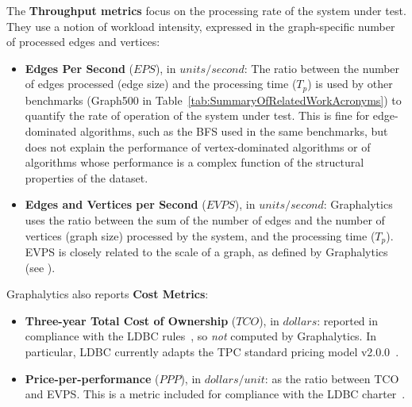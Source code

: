 The {\bf Throughput metrics} focus on the processing rate of the system under test. They use a notion of workload intensity, expressed in the graph-specific number of processed edges and vertices:
\begin{itemize}
	\item {\bf Edges Per Second} ($EPS$), in $units / second$: The ratio between the number of edges processed (edge size) and the processing time ($T_p$) is used by other benchmarks (Graph500 in Table~\ref{tab:SummaryOfRelatedWorkAcronyms}) to quantify the rate of operation of the system under test. This is fine for edge-dominated algorithms, such as the BFS used in the same benchmarks, but does not explain the performance of vertex-dominated algorithms or of algorithms whose performance is a complex function of the structural properties of the dataset.
	
	\item {\bf Edges and Vertices per Second} ($EVPS$), in $units / second$: Graphalytics uses the ratio between the sum of the number of edges and the number of vertices (graph size) processed by the system, and the processing time ($T_p$). EVPS is closely related to the scale of a graph, as defined by Graphalytics (see ).
\end{itemize}

Graphalytics also reports {\bf Cost Metrics}:

\begin{itemize}
	\item {\bf Three-year Total Cost of Ownership} ($TCO$), in $dollars$: reported in compliance with the LDBC rules~\cite{ldbc_byelaws}, so {\it not} computed by Graphalytics. In particular, LDBC currently adapts the TPC standard pricing model v2.0.0~\cite{tpc_pricing}.
	
	\item {\bf Price-per-performance} ($PPP$), in $dollars / unit$: as the ratio between TCO and EVPS. This is a metric included for compliance with the LDBC charter~\cite{ldbc_byelaws}.

	

\end{itemize}



